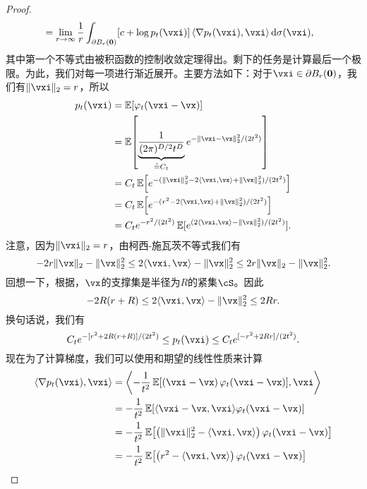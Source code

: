 \documentclass[../../book-main_zh.tex]{subfiles}
\begin{document}
\begin{proof}
\begin{align}
        &= \lim_{r \to \infty}\frac{1}{r}\int_{\partial B_{r}(\vzero)}[c + \log p_{t}(\vxi)]\ip*{\nabla p_{t}(\vxi)}{\vxi}\odif{\sigma(\vxi)},
    \end{align}
    其中第一个不等式由被积函数的控制收敛定理得出。剩下的任务是计算最后一个极限。为此，我们对每一项进行渐近展开。主要方法如下：对于\(\vxi \in \partial B_{r}(\vzero)\)，我们有\(\norm{\vxi}_{2} = r\)，所以
    \begin{align}
        p_{t}(\vxi)
        &= \Ex[\phi_{t}(\vxi - \vx)] \\ 
        &= \Ex\rs{\underbrace{\frac{1}{(2\pi)^{D/2}t^{D}}}_{\doteq C_{t}}e^{-\|\vxi - \vx\|_{2}^{2}/(2t^{2})}} \\
        &= C_{t}\Ex\rs{e^{-(\norm{\vxi}_{2}^{2} - 2\ip{\vxi}{\vx} + \norm{\vx}_{2}^{2})/(2t^{2})}} \\ 
        &= C_{t}\Ex\rs{e^{-(r^{2} - 2\ip{\vxi}{\vx} + \norm{\vx}_{2}^{2})/(2t^{2})}} \\ 
        &= C_{t}e^{-r^{2}/(2t^{2})}\Ex[e^{(2\ip{\vxi}{\vx} - \norm{\vx}_{2}^{2})/(2t^{2})}]. 
    \end{align}
    注意，因为\(\norm{\vxi}_{2} = r\)，由柯西-施瓦茨不等式我们有
    \begin{equation}
        -2r\norm{\vx}_{2} - \norm{\vx}_{2}^{2} \leq 2\ip{\vxi}{\vx} - \norm{\vx}_{2}^{2} \leq 2r\norm{\vx}_{2} - \norm{\vx}_{2}^{2}.
    \end{equation}
    回想一下，根据，\(\vx\)的支撑集是半径为\(R\)的紧集\(\cS\)。因此
    \begin{equation}
        -2R(r + R) \leq 2\ip{\vxi}{\vx} - \norm{\vx}_{2}^{2} \leq 2Rr.
    \end{equation}
    换句话说，我们有
    \begin{equation}
        C_{t}e^{-[r^{2} + 2R(r + R)]/(2t^{2})} \leq p_{t}(\vxi) \leq C_{t}e^{[-r^{2} + 2Rr]/(2t^{2})}.
    \end{equation}
    现在为了计算梯度，我们可以使用和期望的线性性质来计算
    \begin{align}
        \ip{\nabla p_{t}(\vxi)}{\vxi}
        &= \ip*{-\frac{1}{t^{2}}\Ex\rs{\bp{\vxi - \vx}\phi_{t}(\vxi - \vx)}}{\vxi} \\
        &= -\frac{1}{t^{2}}\Ex\rs{\ip{\vxi - \vx}{\vxi}\phi_{t}(\vxi - \vx)} \\
        &= -\frac{1}{t^{2}}\Ex\rs{\bp{\norm{\vxi}_{2}^{2} - \ip{\vxi}{\vx}}\phi_{t}(\vxi - \vx)} \\
        &= -\frac{1}{t^{2}}\Ex\rs{\bp{r^{2} - \ip{\vxi}{\vx}}\phi_{t}(\vxi - \vx)} \\

\end{align}
\end{proof}
\end{document}

